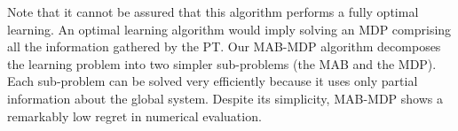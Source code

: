 Note that it cannot be assured that this algorithm performs a fully optimal learning. An optimal learning algorithm would imply solving an MDP comprising all the information gathered by the PT. Our MAB-MDP algorithm decomposes the learning problem into two simpler sub-problems (the MAB and the MDP). Each sub-problem can be solved very efficiently because it uses only partial information about the global system. Despite its simplicity, MAB-MDP shows a remarkably low regret in numerical evaluation.

